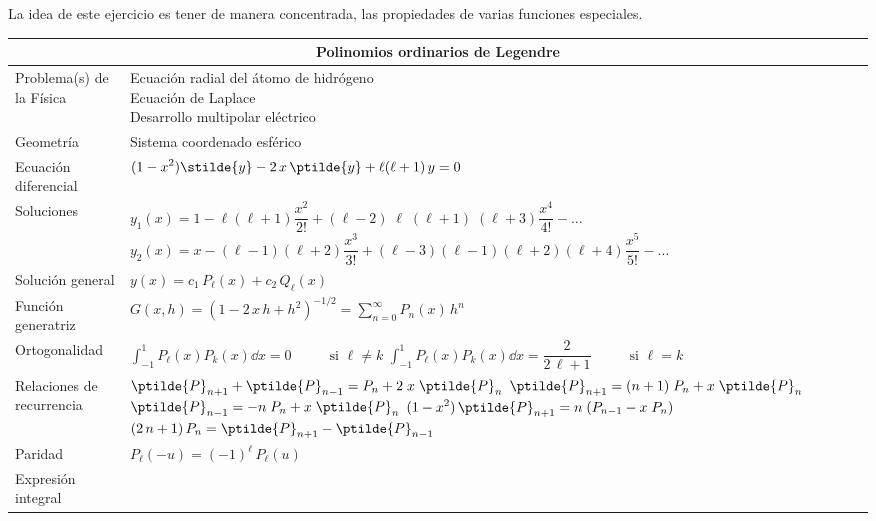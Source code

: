 \begin{enumerate}
La idea de este ejercicio es tener de manera concentrada, las propiedades de varias funciones especiales.

\begin{table}[H]
    \centering
\begin{tabular}{| p{5cm} | p{12cm} |} \hline
\multicolumn{2}{|c|}{\textbf{Polinomios ordinarios de Legendre}} \\ \hline
Problema(s) de la Física & \makecell[l]{Ecuación radial del átomo de hidrógeno \\ Ecuación de Laplace \\ Desarrollo multipolar eléctrico} \\ \hline
Geometría & Sistema coordenado esférico \\ \hline
Ecuación diferencial & \(\displaystyle
(1 - x^{2}) \stilde{y} - 2 \, x \, \ptilde{y} + \ell (\ell + 1) \, y = 0
\) \\ \hline
Soluciones & \makecell[l]{\( y_{1}(x) = 1 - \ell (\ell + 1) \dfrac{x^{2}}{2!} + (\ell - 2)\; \ell \; (\ell + 1)\;(\ell + 3) \dfrac{x^{4}}{4!} - \ldots \) \\ \( y_{2}(x) = x - (\ell - 1)(\ell + 2) \dfrac{x^{3}}{3!} + (\ell - 3) (\ell - 1)(\ell + 2)(\ell + 4) \dfrac{x^{5}}{5!} - \ldots \)}\\ \hline
Solución general & \( \displaystyle y(x) = c_{1} \, P_{\ell}(x) + c_{2} \, Q_{\ell} (x)  \)\\ \hline
Función generatriz & \(\displaystyle G(x ,h) = (1 - 2 \, x \, h + h^{2})^{-1/2} =  \sum_{n=0}^{\infty} P_{n}(x) \, h^{n} \) \\ \hline
Ortogonalidad & \makecell[l]{ \( \displaystyle \int_{-1}^{1} P_{\ell}(x) P_{k}(x) \dd{x} = 0 \hspace{1cm} \mbox{ si $\ell \neq k$} \) \\
\( \displaystyle \int_{-1}^{1} P_{\ell}(x) P_{k}(x) \dd{x} = \dfrac{2}{2 \, \ell + 1} \hspace{1cm} \mbox{ si $\ell = k$} \) } \\ \hline
Relaciones de recurrencia & \makecell[l]{ \( \displaystyle \ptilde{P}_{n+1} + \ptilde{P}_{n-1} =  P_{n} + 2 \; x \; \ptilde{P}_{n} \) \\ \( \displaystyle \ptilde{P}_{n+1} = (n+1) \; P_{n} + x \; \ptilde{P}_{n}\) \\
\( \displaystyle \ptilde{P}_{n-1} = -n \; P_{n} + x \; \ptilde{P}_{n}\) \\
\( \displaystyle (1 - x^{2}) \, \ptilde{P}_{n+1} = n \; (P_{n-1} - x \; P_{n})\) \\
\( \displaystyle (2 \, n + 1) \, P_{n} = \ptilde{P}_{n+1} - \ptilde{P}_{n-1} \)} \\ \hline
Paridad & \( \displaystyle P_{\ell} (-u) = (-1)^{\ell} \, P_{\ell} (u) \) \\ \hline
Expresión integral & \\ \hline
\end{tabular}
\end{table}
\end{enumerate}
